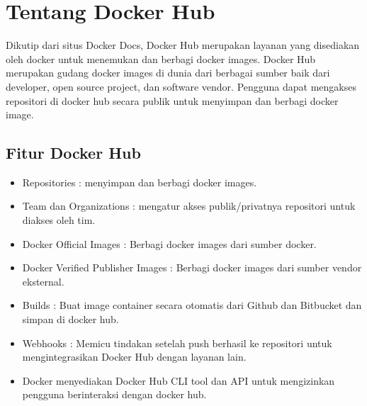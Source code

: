 \chapter{Tentang Docker Hub}
Dikutip dari situs Docker Docs, Docker Hub merupakan layanan yang disediakan oleh docker untuk menemukan dan berbagi docker images. Docker Hub merupakan gudang docker images di dunia dari berbagai sumber baik dari developer, open source project, dan software vendor. Pengguna dapat mengakses repositori di docker hub secara publik untuk menyimpan dan berbagi docker image. 

\section{Fitur Docker Hub}
    \begin{itemize}
        \item Repositories : menyimpan dan berbagi docker images.
        \item Team dan Organizations : mengatur akses publik/privatnya repositori untuk diakses oleh tim.
        \item Docker Official Images : Berbagi docker images dari sumber docker.
        \item Docker Verified Publisher Images : Berbagi docker images dari sumber vendor eksternal.
        \item Builds : Buat image container secara otomatis dari Github dan Bitbucket dan simpan di docker hub.
        \item Webhooks : Memicu tindakan setelah push berhasil ke repositori untuk mengintegrasikan Docker Hub dengan layanan lain.
        \item Docker menyediakan Docker Hub CLI tool dan API untuk mengizinkan pengguna berinteraksi dengan docker hub.
    \end{itemize}
